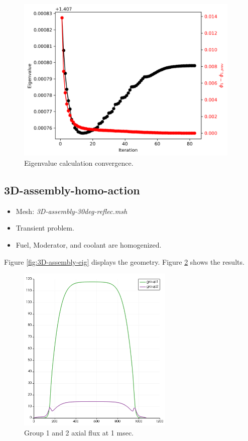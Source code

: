 \documentclass[11pt,letterpaper]{article}
\begin{document}
	\begin{figure}[htbp!]
		\centering
		\includegraphics[height=8cm]{3D-assembly-eig}
		\caption{Eigenvalue calculation convergence.}
		\label{fig:3D-assembly-eig2}
	\end{figure}

\subsection{3D-assembly-homo-action}

	\begin{itemize}
		\item Mesh: \textit{3D-assembly-30deg-reflec.msh}
		\item Transient problem.
		\item Fuel, Moderator, and coolant are homogenized.
	\end{itemize}

Figure \ref{fig:3D-assembly-eig} displays the geometry.
Figure \ref{fig:3D-assembly-homo1} shows the results.

	\begin{figure}[htbp!]
		\centering
		\includegraphics[height=8cm]{3D-assembly-homo}
		\caption{Group 1 and 2 axial flux at 1 msec.}
		\label{fig:3D-assembly-homo1}
	\end{figure}
\end{document}
